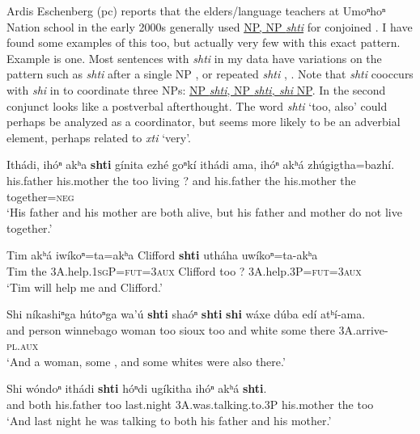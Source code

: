 \documentclass[output=paper]{LSP/langsci}
\begin{document}
Ardis Eschenberg (pc) reports that the elders/language teachers at Umoⁿhoⁿ Nation school in the early 2000s generally used \underline{NP, NP \textit{shti}} for conjoined .  I have found some examples of this too, but actually very few with this exact pattern.  Example  is one.  Most sentences with \textit{shti} in my data have variations on the pattern such as \textit{shti} after a single NP , or repeated \textit{shti} , .   Note that \textit{shti} cooccurs with \textit{shi} in  to coordinate three NPs:  \underline{NP \textit{shti}, NP \textit{shti, shi} NP}.  In  the second conjunct looks like a postverbal afterthought. The word \textit{shti} `too, also' could perhaps be analyzed as a coordinator, but seems more likely to be an adverbial element, perhaps related to \textit{xti} `very'.

\ea\label{ex:rudin:14}
\gll  Ithádi, 	ihóⁿ  	akʰa 	\textbf{shti} 	gínita  	ezhé 	goⁿkí  	ithádi 	ama, 	 ihóⁿ 	akʰá 	zhúgigtha=bazhí.\\
	his.father 	his.mother 	the 	too 	living 	?  	and  	his.father 	the 	his.mother 	the 	together=\textsc{neg}\\
\trans `His father and his mother are both alive, but his father and mother do not live 	together.'

\ex\label{ex:rudin:15} 
\gll Tim 	akʰá 	iwíkoⁿ=ta=akʰa     Clifford \textbf{shti} utháha 	uwíkoⁿ=ta-akʰa\\
Tim the	 \textsc{3A}.help.\textsc{1sgP}=\textsc{fut=3aux}  Clifford too 	? \textsc{3A}.help.\textsc{3P}=\textsc{fut=3aux}\\
\trans `Tim will help me and Clifford.'
  
\ex\label{ex:rudin:16} 
\gll Shi  níkashiⁿga hútoⁿga  wa'ú  \textbf{shti} shaóⁿ \textbf{shti} \textbf{shi} wáxe dúba 	edí 	atʰí-ama.\\
and 	person  winnebago 	woman too sioux  too  and white 	some there \textsc{3A}.arrive-\textsc{pl.aux} \\
\trans `And a  woman, some , and some whites were also there.'

\ex\label{ex:rudin:17}	
\gll Shi 	wóndoⁿ 	ithádi  \textbf{shti } hóⁿdi 	ugíkitha  	ihóⁿ  	akʰá  	\textbf{shti}.\\
	and 	both 	his.father 	too 	last.night 	\textsc{3A}.was.talking.to.\textsc{3P} 	his.mother 	the 	too\\
\trans`And last night he was talking to both his father and his mother.'
\z
\end{document}
